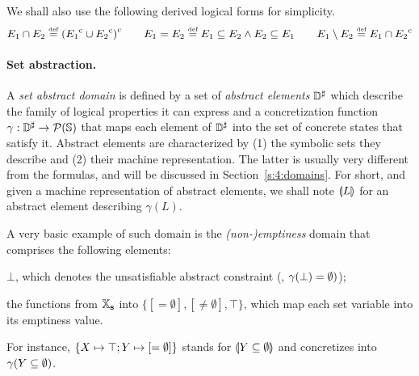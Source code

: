 We shall also use the following derived logical forms for simplicity.
\[
E_1 \cap E_2 \stackrel{\textrm{\tiny def}}{=} {({E_1}^{\mathrm{c}} \cup {E_2}^{\mathrm{c}})}^{\mathrm{c}}
\qquad
E_1 = E_2 \stackrel{\textrm{\tiny def}}{=} E_1 \subseteq E_2 \wedge E_2 \subseteq E_1
\qquad
E_1 \setminus E_2 \stackrel{\textrm{\tiny def}}{=} E_1 \cap {E_2}^{\mathrm{c}}
\]

\paragraph{Set abstraction.}
A {\em set abstract domain} is defined by a set of {\em abstract elements}
\( {\mathbb{D}}^{\sharp} \) which describe the family of logical properties it can
express and a concretization function \( \gamma: {\mathbb{D}}^{\sharp} \rightarrow
\mathcal{P}(\mathbb{S}) \) that maps each element of \( {\mathbb{D}}^{\sharp} \) into the set
of concrete states that satisfy it.
Abstract elements are characterized by
(1) the symbolic sets they describe and
(2) their machine representation.
The latter is usually very different from the formulas, and will be
discussed in Section~\ref{s:4:domains}.
For short, and given a machine representation of abstract elements,
we shall note \( \llparenthesis L \rrparenthesis \) for an abstract element describing
\( \gamma( L ) \).
\begin{example}
  \label{ex:1:mt}
  A very basic example of such domain is the {\em (non-)emptiness} domain
  that comprises the following elements:
  \begin{compactitem}
  \item \( \bot \), which denotes the unsatisfiable abstract constraint
    (\ie, \( \gamma( \bot ) = \emptyset ) \));
  \item the functions from \( \mathbb{X}_{\bf s} \) into \( \{ [=\emptyset],
    [\not=\emptyset], \top \} \), which map each set variable into
    its emptiness value.
  \end{compactitem}
  For instance, \( \{ X \mapsto \top; Y \mapsto [=\emptyset] \} \)
  stands for \( \llparenthesis Y \subseteq \emptyset \rrparenthesis \) and concretizes into
  \( \gamma( Y \subseteq \emptyset ) \).
\end{example}

